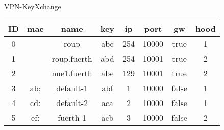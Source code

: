 \begin{frame}{VPN-KeyXchange}
{\begin{tabular}{|c|c|c|c|c|c|c|c|}
            ID & mac & name & key & ip & port & gw & hood \\ \hline
            0 & & roup & abc & 254 & 10000 & true & 1 \\ \hline
            1 & & roup.fuerth & abd & 254 & 10001 & true & 2 \\ \hline
            2 & & nue1.fuerth & abe & 129 & 10001 & true & 2 \\ \hline
            3 & ab: & default-1 & abf & 1 & 10000 & false & 1 \\ \hline
            4 & cd: & default-2 & aca & 2 & 10000 & false & 1 \\ \hline
            5 & ef: & fuerth-1 & acb & 3 & 10000 & false & 2 \\ \hline
        \end{tabular}

}
\end{frame}
